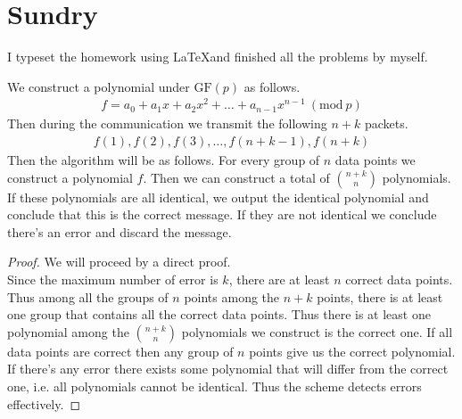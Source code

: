 \documentclass[11pt]{article}
\newcommand{\Mod}[1]{\ (\mathrm{mod}\ #1)}
\begin{document}
\section*{Sundry}

\begin{Answer}
    I typeset the homework using \LaTeX and finished all the problems by myself. 
\end{Answer}

\newpage
{}

\begin{Answer}
    We construct a polynomial under $\mathrm{GF}(p)$ as follows. 
    \begin{align*}
        f = a_0 + a_1x + a_2x^2 + \ldots + a_{n-1}x^{n-1} \Mod{p}
    \end{align*}
    Then during the communication we transmit the following $n + k$ packets. 
    \begin{align*}
        f(1), f(2), f(3), \ldots, f(n+k-1), f(n+k)
    \end{align*}
    Then the algorithm will be as follows. For every group of $n$ data points we construct a polynomial $f$. Then we can construct 
    a total of ${n + k \choose n}$ polynomials. If these polynomials are all identical, we output the identical polynomial and 
    conclude that this is the correct message. If they are not identical we conclude 
    there's an error and discard the message. 
    \begin{proof}
        We will proceed by a direct proof. \\
        Since the maximum number of error is $k$, there are at least $n$ correct data points. Thus among all the groups of $n$ points 
        among the $n+k$ points, there is at least one group that contains all the correct data points. Thus there is at least one 
        polynomial among the ${n+k \choose n}$ polynomials we construct is the correct one. If all data points are correct then 
        any group of $n$ points give us the correct polynomial. If there's any error there exists some polynomial that will differ
        from the correct one, i.e. all polynomials cannot be identical. Thus the scheme detects errors effectively. 
    \end{proof}
\end{Answer}

\newpage
{}
\end{document}
